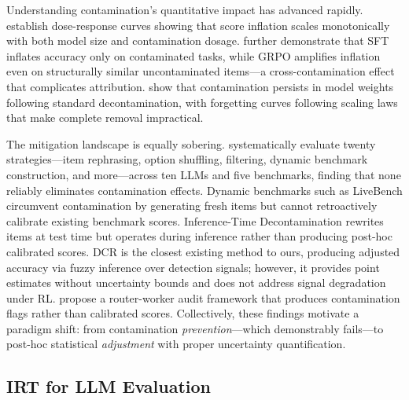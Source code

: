 Understanding contamination's quantitative impact has advanced rapidly. \citet{dong2026dose} establish dose-response curves showing that score inflation scales monotonically with both model size and contamination dosage. \citet{yang2026rl} further demonstrate that SFT inflates accuracy only on contaminated tasks, while GRPO amplifies inflation even on structurally similar uncontaminated items---a cross-contamination effect that complicates attribution. \citet{zhang2025forget} show that contamination persists in model weights following standard decontamination, with forgetting curves following scaling laws that make complete removal impractical.

The mitigation landscape is equally sobering. \citet{xu2025emperor} systematically evaluate twenty strategies---item rephrasing, option shuffling, filtering, dynamic benchmark construction, and more---across ten LLMs and five benchmarks, finding that none reliably eliminates contamination effects. Dynamic benchmarks such as LiveBench \citep{white2024livebench} circumvent contamination by generating fresh items but cannot retroactively calibrate existing benchmark scores. Inference-Time Decontamination \citep{yang2024inference} rewrites items at test time but operates during inference rather than producing post-hoc calibrated scores. DCR \citep{li2025dcr} is the closest existing method to ours, producing adjusted accuracy via fuzzy inference over detection signals; however, it provides point estimates without uncertainty bounds and does not address signal degradation under RL. \citet{rao2026silicon} propose a router-worker audit framework that produces contamination flags rather than calibrated scores. Collectively, these findings motivate a paradigm shift: from contamination \emph{prevention}---which demonstrably fails---to post-hoc statistical \emph{adjustment} with proper uncertainty quantification.

\subsection{IRT for LLM Evaluation}
\label{sec:related:irt}

